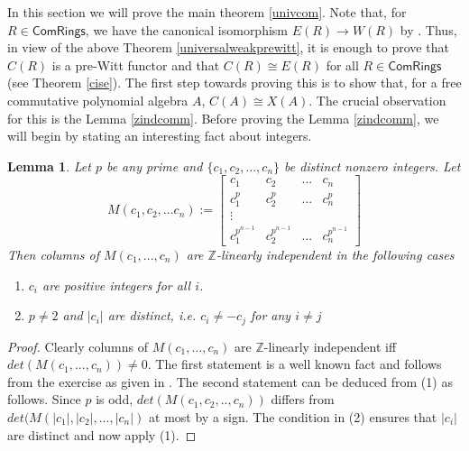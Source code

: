 \documentclass[10pt]{amsart}
\theoremstyle{plain}
\newtheorem{lemma}[thm]{Lemma}
\theoremstyle{definition}
\newcommand{\Z}{{\mathbb Z}}
\newcommand{\Com}{{\mathsf{ComRings}}}
\begin{document}
\noindent In this section we will prove the main theorem \ref{univcom}. Note that, for $R \in \Com$, we have the canonical isomorphism $E(R) \to W(R)$ by \cite[Page 561]{cd}. Thus, in view of the above Theorem \ref{universalweakprewitt}, it is enough to prove that $C(R)$ is a pre-Witt functor and that $C(R) \cong E(R)$ for all $R \in \Com$ (see Theorem \ref{cise}).
The first step towards proving this is to show that, for a free commutative polynomial algebra $A$, $C(A) \cong X(A)$. The crucial observation for this is the Lemma \ref{zindcomm}. Before proving the Lemma \ref{zindcomm}, we will begin by stating an interesting fact about integers. 
\begin{lemma}\label{genvm}
Let $p$ be any prime and $\{c_1,c_2,...,c_n\}$ be distinct nonzero integers. 
Let
$$M(c_1,c_2,...c_n):= \left[\begin{matrix}
c_1 & c_2 & ... & c_n\\
c_1^p & c_2^p & ... & c_n^p\\
\vdots   \\
c_1^{p^{n-1}} & c_2^{p^{n-1}} & ... & c_n^{p^{n-1}}
\end{matrix}\right]$$
Then  columns of $M(c_1,...,c_n)$ are $\Z$-linearly independent in the following cases
\begin{enumerate}
\item $c_i$ are positive integers for  all $i$. 
\item $p\neq 2$ and $|c_i|$ are distinct, i.e. $c_i\neq -c_j$ for any $i\neq j$
\end{enumerate}
\end{lemma}

\begin{proof} Clearly columns of $M(c_1,...,c_n)$ are $\Z$-linearly independent iff $det(M(c_1,...,c_n))\neq 0$.
The first statement is a well known fact and follows from the exercise as given in \cite[page 43]{ps}. The second statement can be deduced from (1) as follows. Since $p$ is odd, $det(M(c_1,c_2,..,c_n))$ differs from $det(M(|c_1|,|c_2|,...,|c_n|)$ at most by a sign. The condition in (2) ensures that $|c_i|$ are distinct and now apply (1).
\end{proof}
\end{document}
